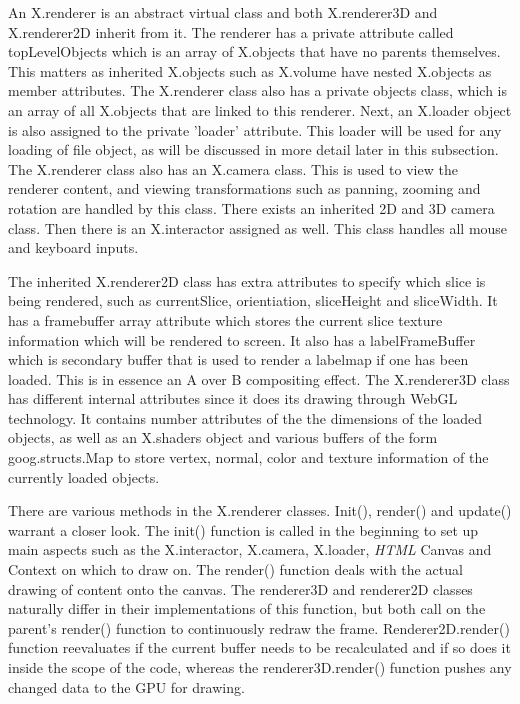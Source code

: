 \documentclass[a4paper,11pt,twoside]{article}
\begin{document}
An X.renderer is an abstract virtual class and both X.renderer3D and X.renderer2D inherit from it. The renderer has a private attribute called topLevelObjects which is an array of X.objects that have no parents themselves. This matters as inherited X.objects such as X.volume have nested X.objects as member attributes. The X.renderer class also has a private objects class, which is an array of all X.objects that are linked to this renderer. Next, an X.loader object is also assigned to the private 'loader' attribute. This loader will be used for any loading of file object, as will be discussed in more detail later in this subsection. The X.renderer class also has an X.camera class. This is used to view the renderer content, and viewing transformations such as panning, zooming and rotation are handled by this class. There exists an inherited 2D and 3D camera class. Then there is an X.interactor assigned as well. This class handles all mouse and keyboard inputs. 

The inherited X.renderer2D class has extra attributes to specify which slice is being rendered, such as currentSlice, orientiation, sliceHeight and sliceWidth. It has a framebuffer array attribute which stores the current slice texture information which will be rendered to screen. It also has a labelFrameBuffer which is secondary buffer that is used to render a labelmap if one has been loaded. This is in essence an A over B compositing effect. The X.renderer3D class has different internal attributes since it does its drawing through WebGL technology. It contains number attributes of the the dimensions of the loaded objects, as well as an X.shaders object and various buffers of the form goog.structs.Map to store vertex, normal, color and texture information of the currently loaded objects.

There are various methods in the X.renderer classes. Init(), render() and update() warrant a closer look. The init() function is called in the beginning to set up main aspects such as the X.interactor, X.camera, X.loader, \textit{HTML} Canvas and Context on which to draw on. The render() function deals with the actual drawing of content onto the canvas. The renderer3D and renderer2D classes naturally differ in their implementations of this function, but both call on the parent's render() function to continuously redraw the frame. Renderer2D.render() function reevaluates if the current buffer needs to be recalculated and if so does it inside the scope of the code, whereas the renderer3D.render() function pushes any changed data to the GPU for drawing. 
\end{document}
